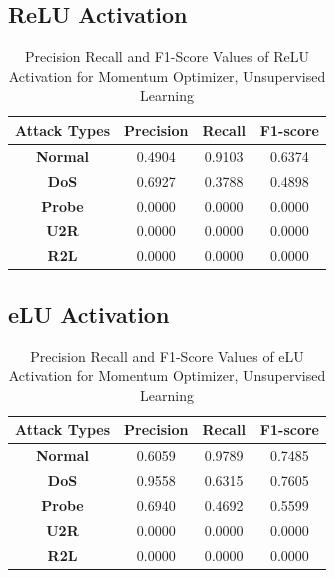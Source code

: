 \documentclass[12pt, a4paper]{report}
\begin{document}
\begin{appendices}
  
  \subsection{ReLU Activation}
  \begin{table}[ht]
		\centering
		\captionsetup{justification=centering,margin=2cm}
		\begin{tabular}{|c|c|c|c|}
		\hline
		\textbf{Attack Types} & \textbf{Precision} & \textbf{Recall} & \textbf{F1-score} \\ \hline
		\textbf{Normal}       & 0.4904             & 0.9103          & 0.6374            \\ \hline
		\textbf{DoS}          & 0.6927             & 0.3788          & 0.4898            \\ \hline
		\textbf{Probe}        & 0.0000             & 0.0000          & 0.0000            \\ \hline
		\textbf{U2R}          & 0.0000             & 0.0000          & 0.0000            \\ \hline
		\textbf{R2L}          & 0.0000             & 0.0000          & 0.0000            \\ \hline
		\end{tabular}
		\caption{Precision Recall and F1-Score Values of ReLU Activation for Momentum Optimizer, Unsupervised Learning}
		\label{classification ReLU sgd tf}
		\end{table} 
\clearpage
   \subsection{eLU Activation}
  \begin{table}[h]
		\centering
		\captionsetup{justification=centering,margin=2cm}
		\begin{tabular}{|c|c|c|c|}
		\hline
		\textbf{Attack Types} & \textbf{Precision} & \textbf{Recall} & \textbf{F1-score} \\ \hline
		\textbf{Normal}       & 0.6059             & 0.9789          & 0.7485            \\ \hline
		\textbf{DoS}          & 0.9558             & 0.6315          & 0.7605            \\ \hline
		\textbf{Probe}        & 0.6940             & 0.4692          & 0.5599            \\ \hline
		\textbf{U2R}          & 0.0000             & 0.0000          & 0.0000            \\ \hline
		\textbf{R2L}          & 0.0000             & 0.0000          & 0.0000            \\ \hline
		\end{tabular}
		\caption{Precision Recall and F1-Score Values of eLU Activation for Momentum Optimizer, Unsupervised Learning}
		\label{classification eLU sgd tf}
		\end{table} 


\end{appendices}
\end{document}
